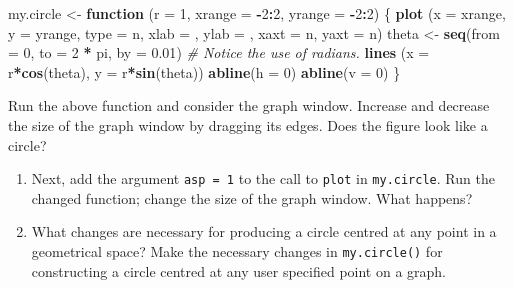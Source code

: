 \documentclass[
]{book}
\newenvironment{Shaded}{\begin{snugshade}}{\end{snugshade}}
\newcommand{\AttributeTok}[1]{\textcolor[rgb]{0.13,0.29,0.53}{#1}}
\newcommand{\CommentTok}[1]{\textcolor[rgb]{0.56,0.35,0.01}{\textit{#1}}}
\newcommand{\ControlFlowTok}[1]{\textcolor[rgb]{0.13,0.29,0.53}{\textbf{#1}}}
\newcommand{\DecValTok}[1]{\textcolor[rgb]{0.00,0.00,0.81}{#1}}
\newcommand{\FloatTok}[1]{\textcolor[rgb]{0.00,0.00,0.81}{#1}}
\newcommand{\FunctionTok}[1]{\textcolor[rgb]{0.13,0.29,0.53}{\textbf{#1}}}
\newcommand{\NormalTok}[1]{#1}
\newcommand{\OtherTok}[1]{\textcolor[rgb]{0.56,0.35,0.01}{#1}}
\newcommand{\SpecialCharTok}[1]{\textcolor[rgb]{0.81,0.36,0.00}{\textbf{#1}}}
\newcommand{\StringTok}[1]{\textcolor[rgb]{0.31,0.60,0.02}{#1}}
\begin{document}
\begin{Shaded}
\begin{Highlighting}[]
\NormalTok{my.circle }\OtherTok{\textless{}{-}} \ControlFlowTok{function}\NormalTok{ (}\AttributeTok{r =} \DecValTok{1}\NormalTok{, }\AttributeTok{xrange =} \SpecialCharTok{{-}}\DecValTok{2}\SpecialCharTok{:}\DecValTok{2}\NormalTok{, }\AttributeTok{yrange =} \SpecialCharTok{{-}}\DecValTok{2}\SpecialCharTok{:}\DecValTok{2}\NormalTok{) }
\NormalTok{\{ }\FunctionTok{plot}\NormalTok{ (}\AttributeTok{x =}\NormalTok{ xrange, }\AttributeTok{y =}\NormalTok{ yrange, }\AttributeTok{type =} \StringTok{\textquotesingle{}n\textquotesingle{}}\NormalTok{, }\AttributeTok{xlab =} \StringTok{\textquotesingle{}\textquotesingle{}}\NormalTok{, }\AttributeTok{ylab =} \StringTok{\textquotesingle{}\textquotesingle{}}\NormalTok{,}
        \AttributeTok{xaxt =} \StringTok{\textquotesingle{}n\textquotesingle{}}\NormalTok{, }\AttributeTok{yaxt =} \StringTok{\textquotesingle{}n\textquotesingle{}}\NormalTok{)}
\NormalTok{  theta }\OtherTok{\textless{}{-}} \FunctionTok{seq}\NormalTok{(}\AttributeTok{from =} \DecValTok{0}\NormalTok{, }\AttributeTok{to =} \DecValTok{2} \SpecialCharTok{*}\NormalTok{ pi, }\AttributeTok{by =} \FloatTok{0.01}\NormalTok{) }
  \CommentTok{\# Notice the use of radians.}
  \FunctionTok{lines}\NormalTok{ (}\AttributeTok{x =}\NormalTok{ r}\SpecialCharTok{*}\FunctionTok{cos}\NormalTok{(theta), }\AttributeTok{y =}\NormalTok{ r}\SpecialCharTok{*}\FunctionTok{sin}\NormalTok{(theta))}
  \FunctionTok{abline}\NormalTok{(}\AttributeTok{h =} \DecValTok{0}\NormalTok{)}
  \FunctionTok{abline}\NormalTok{(}\AttributeTok{v =} \DecValTok{0}\NormalTok{)}
\NormalTok{\}}
\end{Highlighting}
\end{Shaded}

Run the above function and consider the graph window. Increase and decrease the size of the graph window by dragging its edges. Does the figure look like a circle?

\begin{enumerate}
\def\labelenumi{(\roman{enumi})}
\setcounter{enumi}{1}
\item
  Next, add the argument \texttt{asp\ =\ 1} to the call to \texttt{plot} in \texttt{my.circle}. Run the changed function; change the size of the graph window. What happens?
\item
  What changes are necessary for producing a circle centred at any point in a geometrical space? Make the necessary changes in \texttt{my.circle()} for constructing a circle centred at any user specified point on a graph.
\end{enumerate}
\end{document}
